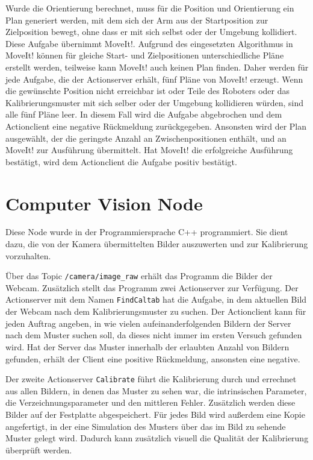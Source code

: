 Wurde die Orientierung berechnet, muss für die Position und Orientierung ein Plan generiert werden, mit dem sich der Arm aus der Startposition zur Zielposition bewegt, ohne dass er mit sich selbst oder der Umgebung kollidiert. Diese Aufgabe übernimmt MoveIt!. Aufgrund des eingesetzten Algorithmus in MoveIt! können für gleiche Start- und Zielpositionen unterschiedliche Pläne erstellt werden, teilweise kann MoveIt! auch keinen Plan finden. Daher werden für jede Aufgabe, die der Actionserver erhält, fünf Pläne von MoveIt! erzeugt. Wenn die gewünschte Position nicht erreichbar ist oder Teile des Roboters oder das Kalibrierungsmuster mit sich selber oder der Umgebung kollidieren würden, sind alle fünf Pläne leer. In diesem Fall wird die Aufgabe abgebrochen und dem Actionclient eine negative Rückmeldung zurückgegeben. Ansonsten wird der Plan ausgewählt, der die geringste Anzahl an Zwischenpositionen enthält, und an MoveIt! zur Ausführung übermittelt. Hat MoveIt! die erfolgreiche Ausführung bestätigt, wird dem Actionclient die Aufgabe positiv bestätigt.

\section{Computer Vision Node} %
\label{sec:caltab_detector_node_impl}
Diese Node wurde in der Programmiersprache C++ programmiert. Sie dient dazu, die von der Kamera übermittelten Bilder auszuwerten und zur Kalibrierung vorzuhalten.

Über das Topic \texttt{/camera/image\_raw} erhält das Programm die Bilder der Webcam. Zusätzlich stellt das Programm zwei Actionserver zur Verfügung. Der Actionserver mit dem Namen \texttt{FindCaltab} hat die Aufgabe, in dem aktuellen Bild der Webcam nach dem Kalibrierungsmuster zu suchen. Der Actionclient kann für jeden Auftrag angeben, in wie vielen aufeinanderfolgenden Bildern der Server nach dem Muster suchen soll, da dieses nicht immer im ersten Versuch gefunden wird. Hat der Server das Muster innerhalb der erlaubten Anzahl von Bildern gefunden, erhält der Client eine positive Rückmeldung, ansonsten eine negative.

Der zweite Actionserver \texttt{Calibrate} führt die Kalibrierung durch und errechnet aus allen Bildern, in denen das Muster zu sehen war, die intrinsischen Parameter, die Verzeichnungsparameter und den mittleren Fehler. Zusätzlich werden diese Bilder auf der Festplatte abgespeichert. Für jedes Bild wird außerdem eine Kopie angefertigt, in der eine Simulation des Musters über das im Bild zu sehende Muster gelegt wird. Dadurch kann zusätzlich visuell die Qualität der Kalibrierung überprüft werden.

